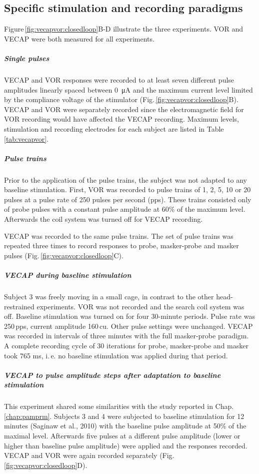 \subsection{Specific stimulation and recording paradigms}
Figure\,\ref{fig:vecapvor:closedloop}B-D illustrate the three experiments. VOR and VECAP were both measured for all experiments. 

\subparagraph{Single pulses} VECAP and VOR responses were recorded to at least seven different pulse amplitudes linearly spaced between \SI{0}{\micro\ampere} and the maximum current level limited by the compliance voltage of the stimulator (Fig.\,\ref{fig:vecapvor:closedloop}B). VECAP and VOR were separately recorded since the electromagnetic field for VOR recording would have affected the VECAP recording. Maximum levels, stimulation and recording electrodes for each subject are listed in Table\,\ref{tab:vecapvor}.
   
\subparagraph{Pulse trains}
Prior to the application of the pulse trains, the subject was not adapted to any baseline stimulation. First, VOR was recorded to pulse trains of 1, 2, 5, 10 or 20 pulses at a pulse rate of 250 pulses per second (pps). These trains consisted only of probe pulses with a constant pulse amplitude at 60\% of the maximum level. Afterwards the coil system was turned off for VECAP recording.

VECAP was recorded to the same pulse trains. The set of pulse trains was repeated three times to record responses to probe, masker-probe and masker pulses (Fig.\,\ref{fig:vecapvor:closedloop}C).

\subparagraph{VECAP during baseline stimulation}  
Subject 3 was freely moving in a small cage, in contrast to the other head-restrained experiments. VOR was not recorded and the search coil system was off. Baseline stimulation was turned on for four 30-minute periods. Pulse rate was 250\,pps, current amplitude 160\,cu. Other pulse settings were unchanged. VECAP was recorded in intervals of three minutes with the full masker-probe paradigm. A complete recording cycle of 30 iterations for probe, masker-probe and masker took 765 ms, i.\,e. no baseline stimulation was applied during that period. 

\subparagraph{VECAP to pulse amplitude steps after adaptation to baseline stimulation}
This experiment shared some similarities with the study reported in Chap.\,\ref{chap:pamprm}. Subjects 3 and 4 were subjected to baseline stimulation for 12 minutes (Saginaw et al., 2010) with the baseline pulse amplitude at 50\% of the maximal level. Afterwards five pulses at a different pulse amplitude (lower or higher than baseline pulse amplitude) were applied and the responses recorded. VECAP and VOR were again recorded separately (Fig.\,\ref{fig:vecapvor:closedloop}D). 


